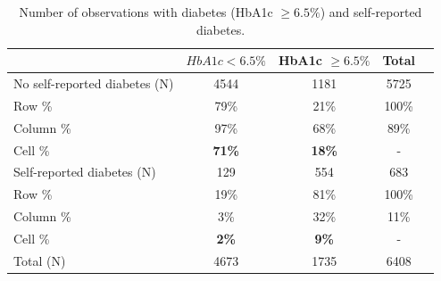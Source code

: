 \documentclass[12pt,english]{article}
\begin{document}
\clearpage
\begin{table}[p]
	\caption{\label{tab:Biomarker_observations}Number of observations with diabetes (HbA1c $\geq 6.5\%$) and self-reported diabetes.}
	\begin{center}
		\begin{adjustbox}{max width=\linewidth}
			\begin{threeparttable}
				{
					\def\sym#1{\ifmmode^{#1}\else\(^{#1}\)\fi}
					\begin{tabular}{lcccc}
						\toprule
						&\multicolumn{1}{c}{$HbA1c < 6.5\%$}&\multicolumn{1}{c}{HbA1c $\geq 6.5\%$}&\multicolumn{1}{c}{Total}\\
						\midrule
						No self-reported diabetes (N) & 4544 & 1181 & 5725 &  \\
						\hspace*{10mm}Row  \% & 79\% & 21\% & 100\% &  \\
						\hspace*{10mm}Column \% & 97\% & 68\% & 89\% &  \\
						\hspace*{10mm}Cell \% & \textbf{71\%} & \textbf{18\%} & - & \\
						Self-reported diabetes (N) & 129 & 554 & 683 &  \\
						\hspace*{10mm}Row \%  & 19\% & 81\% & 100\% &  \\
						\hspace*{10mm}Column \% & 3\% & 32\% & 11\% &  \\
						\hspace*{10mm}Cell \% & \textbf{2\%} &\textbf{9\%} &- & \\
						Total (N) & 4673 & 1735 & 6408 &  \\ 
						\bottomrule
					\end{tabular}
					\begin{tablenotes}
						\item
					\end{tablenotes}
				}
			\end{threeparttable}
		\end{adjustbox}
	\end{center}
\end{table}


\clearpage
\end{document}
